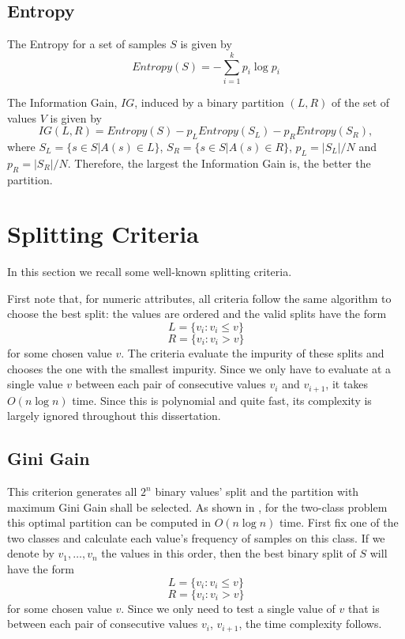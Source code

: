 \subsection{Entropy}
The Entropy for a set of samples $S$ is given by 
\begin{equation}
 Entropy(S) =  - \sum_{i=1}^k p_i \log p_i
\label{eq:entropy}
\end{equation}

The Information Gain, $IG$, induced by a binary partition $(L,R)$ 
of the set of values $V$ is given by 
\begin{equation}
 IG(L,R) = Entropy(S) -
p_L Entropy(S_L) - p_R Entropy(S_R),
\label{eq:InformationGain}
\end{equation}
where $S_L= \{ s \in S | A(s) \in L \}$, $S_R= \{ s \in S | A(s) \in R \}$,
 $p_L=|S_L| /N $ and $p_R=|S_R| /N$. Therefore, the largest the Information Gain is, the better the partition.


\section{Splitting Criteria}
In this section we recall some well-known splitting criteria.

First note that, for numeric attributes, all criteria follow the same algorithm to choose the best split: the values are ordered and the valid splits have the form 
$$L = \{v_i : v_i \leq v\}$$
$$R = \{v_i : v_i > v\}$$
for some chosen value $v$. The criteria evaluate the impurity of these splits and chooses the one with the smallest impurity. Since we only have to evaluate at a single value $v$ between each pair of consecutive values $v_i$ and $v_{i+1}$, it takes $O(n \log n)$ time. Since this is polynomial and quite fast, its complexity is largely ignored throughout this dissertation.

\subsection{Gini Gain}
This criterion generates all $2^n$ binary values' split and the partition with maximum Gini Gain shall be selected.
As shown in \cite{Breiman84}, for the two-class problem this optimal partition  
can be computed  in $O(n \log n)$ time. First fix one of the two classes and calculate each value's frequency of samples on this class.
If we denote by $v_1,\ldots,v_n$ the values in this order, then the best binary split of $S$ will have the form 
$$L = \{v_i : v_i \leq v\}$$
$$R = \{v_i : v_i > v\}$$
for some chosen value $v$. Since we only need to test a single value of $v$ that is between each pair of consecutive values $v_i$, $v_{i+1}$, the time complexity follows.

